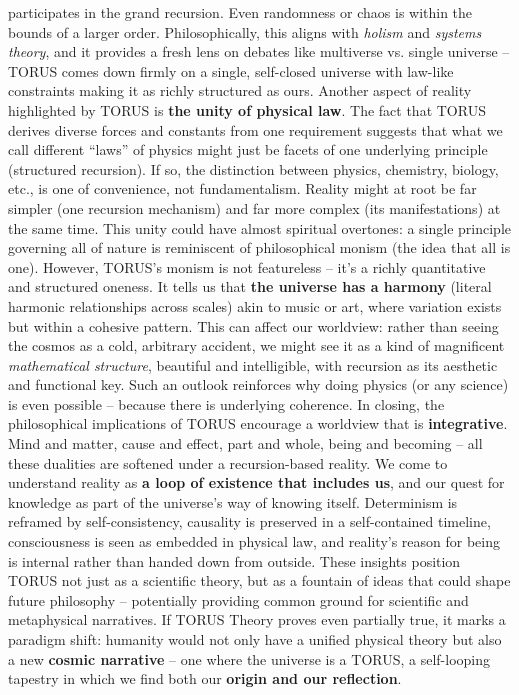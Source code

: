 \documentclass[
]{article}
\begin{document}
\begin{itemize}
  participates in the grand recursion. Even randomness or chaos is
  within the bounds of a larger order. Philosophically, this aligns with
  \emph{holism} and \emph{systems theory}, and it provides a fresh lens
  on debates like multiverse vs. single universe -- TORUS comes down
  firmly on a single, self-closed universe with law-like constraints
  making it as richly structured as ours. Another aspect of reality
  highlighted by TORUS is \textbf{the unity of physical law}. The fact
  that TORUS derives diverse forces and constants from one requirement
  suggests that what we call different ``laws'' of physics might just be
  facets of one underlying principle (structured recursion). If so, the
  distinction between physics, chemistry, biology, etc., is one of
  convenience, not fundamentalism. Reality might at root be far simpler
  (one recursion mechanism) and far more complex (its manifestations) at
  the same time. This unity could have almost spiritual overtones: a
  single principle governing all of nature is reminiscent of
  philosophical monism (the idea that all is one). However, TORUS's
  monism is not featureless -- it's a richly quantitative and structured
  oneness. It tells us that \textbf{the universe has a harmony} (literal
  harmonic relationships across scales\hspace{0pt}) akin to music or
  art, where variation exists but within a cohesive pattern. This can
  affect our worldview: rather than seeing the cosmos as a cold,
  arbitrary accident, we might see it as a kind of magnificent
  \emph{mathematical structure}, beautiful and intelligible, with
  recursion as its aesthetic and functional key. Such an outlook
  reinforces why doing physics (or any science) is even possible --
  because there is underlying coherence. In closing, the philosophical
  implications of TORUS encourage a worldview that is
  \textbf{integrative}. Mind and matter, cause and effect, part and
  whole, being and becoming -- all these dualities are softened under a
  recursion-based reality. We come to understand reality as \textbf{a
  loop of existence that includes us}, and our quest for knowledge as
  part of the universe's way of knowing itself. Determinism is reframed
  by self-consistency, causality is preserved in a self-contained
  timeline, consciousness is seen as embedded in physical law, and
  reality's reason for being is internal rather than handed down from
  outside. These insights position TORUS not just as a scientific
  theory, but as a fountain of ideas that could shape future philosophy
  -- potentially providing common ground for scientific and metaphysical
  narratives. If TORUS Theory proves even partially true, it marks a
  paradigm shift: humanity would not only have a unified physical theory
  but also a new \textbf{cosmic narrative} -- one where the universe is
  a TORUS, a self-looping tapestry in which we find both our
  \textbf{origin and our reflection}.
\end{itemize}
\end{document}
